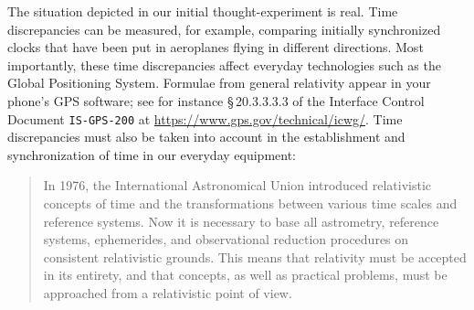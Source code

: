 \documentclass[a4paper,12pt,%
onecolumn,oneside,titlepage,%
british%
]{memoir}
\renewcommand*{\|}[1][]{\nonscript\:#1\vert\nonscript\:\mathopen{}}
\newcommand*{\sect}{\S}%
\begin{document}
The situation depicted in our initial thought-experiment is real. Time discrepancies can be measured, for example, comparing initially synchronized clocks that have been put in aeroplanes flying in different directions. Most importantly, these time discrepancies affect everyday technologies such as the Global Positioning System. Formulae from general relativity appear in your phone's GPS software; see for instance \sect\,20.3.3.3.3 of the Interface Control Document \texttt{IS-GPS-200} at \url{https://www.gps.gov/technical/icwg/}. Time discrepancies must also be taken into account in the establishment and synchronization of time in our everyday equipment:
\begin{quote}\footnotesize
  In 1976, the International Astronomical Union introduced relativistic concepts of time and the transformations between various time scales and reference systems. \textelp{} Now \textelp{} it is necessary to base all astrometry, reference systems, ephemerides, and observational reduction procedures on consistent relativistic grounds. This means that relativity must be accepted in its entirety, and that concepts, as well as practical problems, must be approached from a relativistic point of view.
\end{quote}
%
\end{document}
